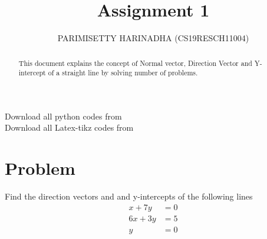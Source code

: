 \documentclass[journal,12pt,twocolumn]{IEEEtran}
\title{Assignment 1}
\author{PARIMISETTY HARINADHA (CS19RESCH11004)}
\begin{document}
\maketitle
\newpage
\begin{abstract}
This document explains the concept of Normal vector, Direction Vector and Y-intercept of a straight line by solving number of problems.
\end{abstract}
Download all python codes from 
 \\
\newline
Download all Latex-tikz codes from 

\section{Problem}
Find the direction vectors and and y-intercepts of the following lines \\
\begin{align*} 
x  + 7y &=  0\\
6x + 3y &=  5\\
      y &=  0
\end{align*}
\end{document}
